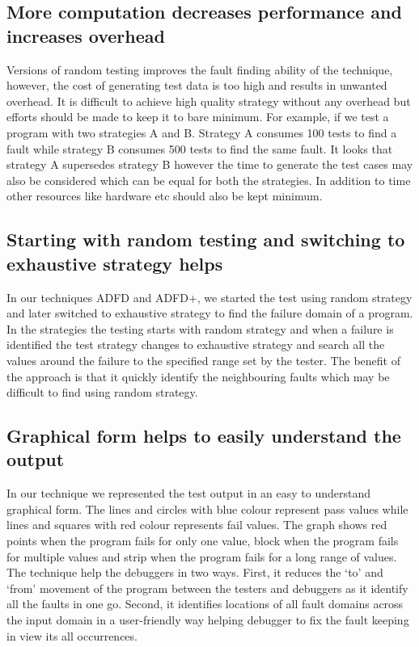    
\subsection{More computation decreases performance and increases overhead}
Versions of random testing \cite{} improves the fault finding ability of the technique, however, the cost of generating test data is too high and results in unwanted overhead. It is difficult to achieve high quality strategy without any overhead but efforts should be made to keep it to bare minimum. For example, if we test a program with two strategies A and B. Strategy A consumes 100 tests to find a fault while strategy B consumes 500 tests to find the same fault.  It looks that strategy A supersedes strategy B however the time to generate the test cases may also be considered which can be equal for both the strategies. In addition to time other resources like hardware etc should also be kept minimum.


\subsection{Starting with random testing and switching to exhaustive strategy helps}
In our techniques ADFD and ADFD+, we started the test using random strategy and later switched to exhaustive strategy to find the failure domain of a program. In the strategies the testing starts with random strategy and when a failure is identified the test strategy changes to exhaustive strategy and search all the values around the failure to the specified range set by the tester. The benefit of the approach is that it quickly identify the neighbouring faults which may be difficult to find using random strategy. 


\subsection{Graphical form helps to easily understand the output}
In our technique we represented the test output in an easy to understand graphical form. The lines and circles with blue colour represent pass values while lines and squares with red colour represents fail values. The graph shows red points when the program fails for only one value, block when the program fails for multiple values and strip when the program fails for a long range of values.  The technique help the debuggers in two ways. First, it reduces the `to' and `from' movement of the program between the testers and debuggers as it identify all the faults in one go. Second, it identifies locations of all fault domains across the input domain in a user-friendly way helping debugger to fix the fault keeping in view its all occurrences.

